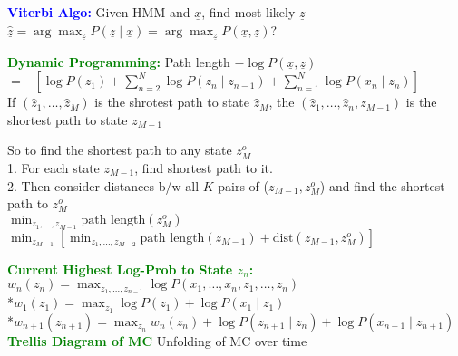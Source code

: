 \documentclass[5pt]{extarticle} %
\begin{document}
\begin{paracol}{3}
{    \textcolor{blue}{\textbf{Viterbi Algo:}} Given HMM and $\underline{x}$, find most likely $\underline{z}$ \\
    $\hat{\underline{z}} = \arg \max_{\underline{z}} P(\underline{z} \mid \underline{x}) = \arg \max_{\underline{z}} P(\underline{x}, \underline{z})$?

    \textcolor{green}{\textbf{Dynamic Programming:}} Path length $- \log P(\underline{x}, \underline{z})$ \\ $= - \left[\log P(z_1) + \sum_{n=2}^N \log P(z_n \mid z_{n-1}) + \sum_{n=1}^N \log P(x_n \mid z_n)\right]$ \\
    If $(\hat{z}_1,\ldots,\hat{z}_M)$ is the shrotest path to state $\hat{z}_M$, the $(\hat{z}_1,\ldots,\hat{z}_n,z_{M-1})$ is the shortest path to state $z_{M-1}$ 
    
    So to find the shortest path to any state $z_M^o$ \\
    1. For each state $z_{M-1}$, find shortest path to it. \\
    2. Then consider distances b/w all $K$ pairs of ($z_{M-1},z_M^o$) and find the shortest path to $z_M^o$ \\
    $\min_{z_1,\ldots,z_{M-1}} \text{path length}(z_M^o)$ \\
    $\min_{z_{M-1}} \left[ \min_{z_1,\ldots,z_{M-2}} \text{path length}(z_{M-1}) + \text{dist} (z_{M-1},z_M^o)\right]$ 

    \textcolor{green}{\textbf{Current Highest Log-Prob to State $z_n$:}} \\
    $w_n(z_n) = \max_{z_1,\ldots,z_{n-1}} \log P(x_1,\ldots,x_n,z_1,\ldots,z_n)$ \\
    *$w_1(z_1) = \max_{z_1} \log P(z_1) + \log P(x_1 \mid z_1)$ \\
    *$w_{n+1}(z_{n+1}) = \max_{z_n} w_n(z_n) + \log P(z_{n+1} \mid z_n) + \log P(x_{n+1} \mid z_{n+1})$ \\

    \textcolor{green}{\textbf{Trellis Diagram of MC}} Unfolding of MC over time \\



    }
\end{paracol}
\end{document}
